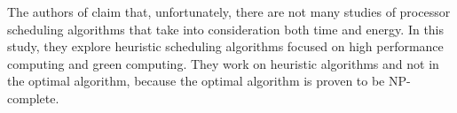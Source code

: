 The authors of \cite{EXE_METHOD} claim that, unfortunately, there are not many
studies of processor scheduling algorithms that take into consideration both
time and energy. In this study, they explore heuristic scheduling algorithms
focused on high performance computing and green computing. They work on
heuristic algorithms and not in the optimal algorithm, because the optimal
algorithm is proven to be NP-complete. 
